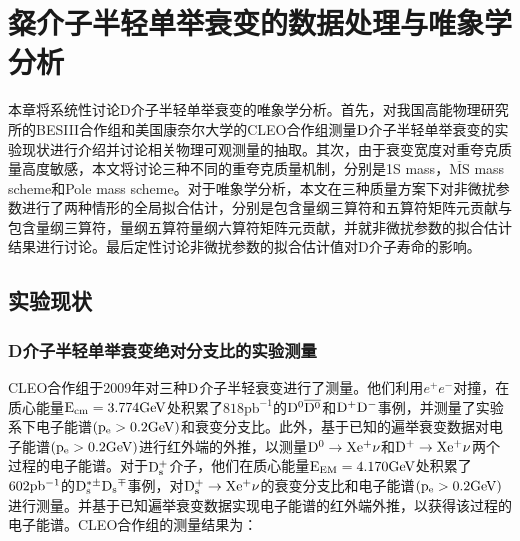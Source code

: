 \chapter{粲介子半轻单举衰变的数据处理与唯象学分析}
\label{chapter: D_meson_case_fitting}
本章将系统性讨论D介子半轻单举衰变的唯象学分析。首先，对我国高能物理研究所的BESIII合作组和美国康奈尔大学的CLEO合作组测量$\mathrm{D}$介子半轻单举衰变的实验现状进行介绍并讨论相关物理可观测量的抽取。其次，由于衰变宽度对重夸克质量高度敏感，本文将讨论三种不同的重夸克质量机制，分别是1S mass，$\overline{\mathrm{MS}}$ mass scheme和Pole mass scheme。对于唯象学分析，本文在三种质量方案下对非微扰参数进行了两种情形的全局拟合估计，分别是包含量纲三算符和五算符矩阵元贡献与包含量纲三算符，量纲五算符量纲六算符矩阵元贡献，并就非微扰参数的拟合估计结果进行讨论。最后定性讨论非微扰参数的拟合估计值对D介子寿命的影响。
\section{实验现状}
\subsection{D介子半轻单举衰变绝对分支比的实验测量}
CLEO合作组于2009年对三种$\mathrm{D}$介子半轻衰变进行了测量。他们利用$e^{+}e^{-}$对撞，在质心能量$\mathrm{E_{\mathrm{cm}}}=3.774 \mathrm{GeV}$处积累了$818 \mathrm{pb}^{-1}$的$\mathrm{D^{0}\overline{D^{0}}}$和$\mathrm{D^{+} D^{-}}$事例，并测量了实验系下电子能谱$(\mathrm{p_{e}>0.2\mathrm{GeV}})$和衰变分支比。此外，基于已知的遍举衰变数据对电子能谱$(\mathrm{p_{e}>0.2\mathrm{GeV}})$进行红外端的外推，以测量$\mathrm{D^{0}\to X e^{+}\nu}$和$\mathrm{D^{+}\to X e^{+}\nu}$两个过程的电子能谱。对于$\mathrm{D_s^+}$介子，他们在质心能量$\mathrm{E_{\mathrm{EM}}=4.170\mathrm{GeV}}$处积累了$602 \mathrm{pb^{-1}}$的$\mathrm{D_s^{*\pm}\mathrm{D_s}^{\mp}}$事例，对$\mathrm{D_s^{+}\to X e^{+}\nu}$的衰变分支比和电子能谱$(\mathrm{p_{e}>0.2\mathrm{GeV}})$进行测量。并基于已知遍举衰变数据实现电子能谱的红外端外推，以获得该过程的电子能谱。CLEO合作组的测量结果为：

